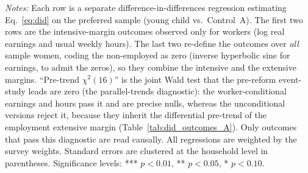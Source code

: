 \begin{table}[H]\centering
\caption{Earnings and Hours: Worker-Conditional and Unconditional Estimates}
\label{tab:earnings_margins}\small
{}
\par\vspace{3pt}\footnotesize\raggedright \textit{Notes:} Each row is a separate difference-in-differences regression estimating Eq.~\eqref{eq:did} on the preferred sample (young child vs.\ Control~A). The first two rows are the intensive-margin outcomes observed only for workers (log real earnings and usual weekly hours). The last two re-define the outcomes over \emph{all} sample women, coding the non-employed as zero (inverse hyperbolic sine for earnings, to admit the zeros), so they combine the intensive and the extensive margins. ``Pre-trend $\chi^2(16)$'' is the joint Wald test that the pre-reform event-study leads are zero (the parallel-trends diagnostic): the worker-conditional earnings and hours pass it and are precise nulls, whereas the unconditional versions reject it, because they inherit the differential pre-trend of the employment extensive margin (Table~\ref{tab:did_outcomes_A}). Only outcomes that pass this diagnostic are read causally. All regressions are weighted by the survey weights. Standard errors are clustered at the household level in parentheses. Significance levels: *** $p<0.01$, ** $p<0.05$, * $p<0.10$.
\end{table}
